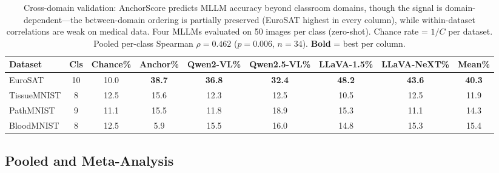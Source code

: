 \documentclass[a4paper,fleqn]{cas-sc}
\begin{document}
\begin{table}[t]
\caption{Cross-domain validation: AnchorScore predicts MLLM accuracy beyond classroom domains, though the signal is domain-dependent---the between-domain ordering is partially preserved (EuroSAT highest in every column), while within-dataset correlations are weak on medical data. Four MLLMs evaluated on 50 images per class (zero-shot). Chance rate = $1/C$ per dataset. Pooled per-class Spearman $\rho=0.462$ ($p=0.006$, $n=34$). \textbf{Bold} = best per column.}
\label{tab:cross_mllm}
\centering
\footnotesize
\setlength{\tabcolsep}{3.5pt}
\begin{tabular}{lcccccccc}
\toprule
\textbf{Dataset} & \textbf{Cls} & \textbf{Chance\%} & \textbf{Anchor\%} & \textbf{Qwen2-VL\%} & \textbf{Qwen2.5-VL\%} & \textbf{LLaVA-1.5\%} & \textbf{LLaVA-NeXT\%} & \textbf{Mean\%} \\
\midrule
EuroSAT & 10 & 10.0 & \textbf{38.7} & \textbf{36.8} & \textbf{32.4} & \textbf{48.2} & \textbf{43.6} & \textbf{40.3} \\
TissueMNIST & 8 & 12.5 & 15.6 & 12.3 & 12.5 & 10.5 & 12.5 & 11.9 \\
PathMNIST & 9 & 11.1 & 15.5 & 11.8 & 18.9 & 15.3 & 11.1 & 14.3 \\
BloodMNIST & 8 & 12.5 & 5.9 & 15.5 & 16.0 & 14.8 & 15.3 & 15.4 \\
\bottomrule
\end{tabular}
\end{table}

\subsection{Pooled and Meta-Analysis}
\label{sec:pooled_meta}
\end{document}
